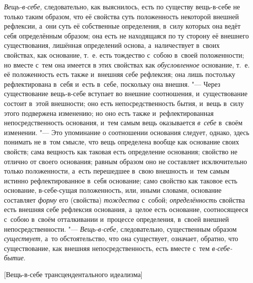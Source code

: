 {\em Вещь-в-себе,} следовательно, как выяснилось, есть
по существу вещь-в-себе не только таким образом, что её свойства суть
положенность некоторой внешней рефлексии, а~они суть её собственные
определения, в~силу которых она ведёт себя определённым образом; она есть
не находящаяся по ту сторону её внешнего существования, лишённая
определений основа, а~наличествует в~своих свойствах, как основание, т.~е.
есть тождество с~собою в~своей положенности; но вместе с~тем она имеется в
этих свойствах как {\em обусловленное} основание, т.~е.
её положенность есть также и~внешняя себе рефлексия; она лишь постольку
рефлектирована в~себя и~есть в~себе, поскольку она внешня. "--- Через
существование вещь-в-себе вступает во внешние соотношения, и~существование
состоит в~этой внешности; оно есть непосредственность бытия, и~вещь в~силу
этого подвержена изменению; но оно есть также и~рефлектированная
непосредственность основания, и~тем самым вещь оказывается
{\em в~себе} в~своём изменении. "--- Это упоминание о
соотношении основания следует, однако, здесь понимать не в~том смысле, что
вещь определена вообще как основание своих свойств; сама вещность как
таковая есть определение основания; свойство не отлично от своего
основания; равным образом оно не составляет исключительно только
положенности, а~есть перешедшее в~свою внешность и~тем самым истинно
рефлектированное в~себя основание; само свойство как таковое есть
основание, в-себе-сущая положенность, или, иными словами, основание
составляет {\em форму} его (свойства) {\em тождества} с~собой;
{\em определённость} свойства есть внешняя себе
рефлексия основания, а~целое есть основание, соотносящееся с~собою в~своём
отталкивании и~процессе определения, в~своей внешней непосредственности. "---
{\em Вещь-в-себе,} следовательно, существенным образом
{\em существует,} а~то обстоятельство, что она
существует, означает, обратно, что существование, как внешняя
непосредственность, есть вместе с~тем {\em в-себе-бытие}.

%
  {[Вещь-в-себе трансцендентального идеализма]}

